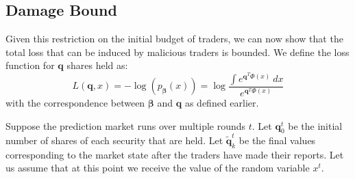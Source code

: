 \documentclass{article}
\newcommand{\betavec}{\pmb{\beta}}
\newcommand{\qvec}{\mathbf{q}}
\begin{document}
\subsection{Damage Bound}
Given this restriction on the initial budget of traders, we can now show that the total loss that can be induced by malicious traders is bounded. We define the loss function for $\qvec$ shares held as:
$$L(\qvec,x)=-\log(p_{\betavec}(x))=\log\frac{\int e^{\qvec^{T}\Phi(x)}\ dx}{e^{\qvec^{T}\Phi(x)}}$$
with the correspondence between $\betavec$ and $\qvec$ as defined earlier. %



Suppose the prediction market runs over multiple rounds $t$. Let $\qvec_{0}^{t}$ be the initial number of shares of each security that are held. Let $\tilde{\qvec}_{k}^{t}$ be the final values corresponding to the market state after the traders have made their reports. Let us assume that at this point we receive the value of the random variable $x^{t}$. 


\end{document}
